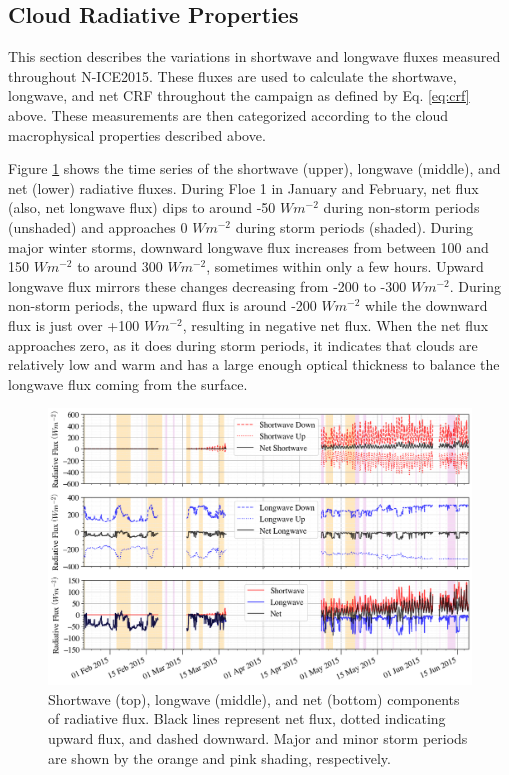 \subsection{Cloud Radiative Properties}
This section describes the variations in shortwave and longwave fluxes measured throughout N-ICE2015. These fluxes are used to calculate the shortwave, longwave, and net CRF throughout the campaign as defined by Eq. \ref{eq:crf} above. These measurements are then categorized according to the cloud macrophysical properties described above.

Figure \ref{fig:flux:all} shows the time series of the shortwave (upper), longwave (middle), and net (lower) radiative fluxes. During Floe 1 in January and February, net flux (also, net longwave flux) dips to around -50 $Wm^{-2}$ during non-storm periods (unshaded) and approaches 0 $Wm^{-2}$ during storm periods (shaded). During major winter storms, downward longwave flux increases from between 100 and 150 $W m^{-2}$ to around 300 $Wm^{-2}$, sometimes within only a few hours. Upward longwave flux mirrors these changes decreasing from -200 to -300 $Wm^{-2}$. During non-storm periods, the upward flux is around -200 $Wm^{-2}$ while the downward flux is just over +100 $Wm^{-2}$, resulting in negative net flux. When the net flux approaches zero, as it does during storm periods, it indicates that clouds are relatively low and warm and has a large enough optical thickness to balance the longwave flux coming from the surface.

\begin{figure}[h]
    \centering
    \includegraphics[width=1\linewidth]{figures/chapter4/RadComp.png}
    \caption[Shortwave, longwave, and net radiative components of flux.]{Shortwave (top), longwave (middle), and net (bottom) components of radiative flux. Black lines represent net flux, dotted indicating upward flux, and dashed downward. Major and minor storm periods are shown by the orange and pink shading, respectively.}
    \label{fig:flux:all}
\end{figure}

